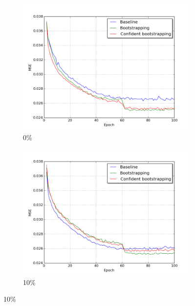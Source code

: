 \begin{figure}[H]
\begin{subfigure}{0.3\textwidth}
\includegraphics[width=\textwidth]{figs/E2/lc_0.png}
\caption{ 0\% } \label{fig:app_E2_0_lc}
\vspace{0.1cm} %
\end{subfigure}
\hspace*{\fill} %
\begin{subfigure}{0.31\textwidth}
\includegraphics[width=\textwidth]{figs/E2/lc_1.png}
\caption{10\% } \label{fig:app_E2_1_lc}
\vspace{0.1cm} %

\end{subfigure}
\end{figure}
